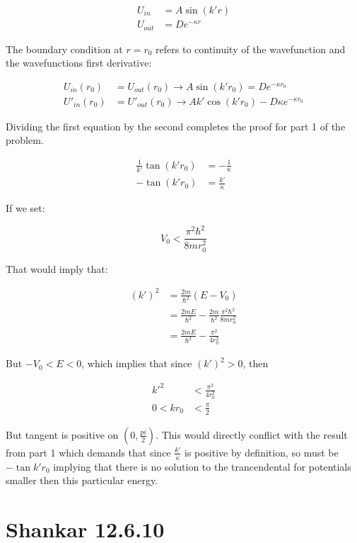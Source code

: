 \documentclass[paper=a4, fontsize=11pt]{scrartcl} %
\numberwithin{equation}{section} %
\numberwithin{figure}{section} %
\numberwithin{table}{section} %
\begin{document}
\begin{align}
U_{in} &= A \sin(k'r) \\ 
U_{out} &= De^{-\kappa r}
\end{align}

The boundary condition at $r=r_0$ refers to continuity of the wavefunction and the wavefunctions first derivative:

\begin{align}
U_{in}(r_0) &= U_{out}(r_0) \rightarrow A \sin(k'r_0) = D e^{- \kappa r_0} \\ 
U'_{in}(r_0) &= U'_{out}(r_0) \rightarrow A k' \cos(k' r_0) - D \kappa e^{-\kappa r_0}  
\end{align}

Dividing the first equation by the second completes the proof for part 1 of the problem.

\begin{align}
\frac{1}{k'} \tan(k' r_0) &= -\frac{1}{\kappa} \\
- \tan(k' r_0) &= \frac{k'}{\kappa} 
\end{align}

If we set:

\begin{equation}
V_0 < \frac{\pi^2 \hbar^2}{8 m r_0^2}
\end{equation}

That would imply that:

\begin{align}
(k')^2 &= \frac{2m}{\hbar^2}(E - V_0) \\ 
& = \frac{2mE}{\hbar^2} - \frac{2m}{\hbar^2} \frac{\pi^2 \hbar^2}{8 m r_0^2} \\
& = \frac{2mE}{\hbar^2} - \frac{\pi^2}{4  r_0^2} 
\end{align}

But $-V_0 < E < 0$, which implies that since $(k')^2 > 0$, then 

\begin{align}
k'^2 &< \frac{\pi^2}{4 r_0^2} \\
0 < k r_0 &< \frac{\pi}{2}
\end{align}

But tangent is positive on $(0, \frac{pi}{2})$. This would directly conflict with the result from part 1 which demands that since $\frac{k'}{\kappa}$ is positive by definition, so must be $-\tan{k' r_0}$ implying that there is no solution to the trancendental for potentials smaller then this particular energy.

\section{Shankar 12.6.10}
\end{document}
